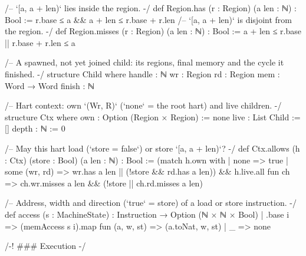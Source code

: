 \begin{leancode}[fontsize=\scriptsize,label={\footnotesize Contract/Machine.lean}]
/-- `[a, a + len)` lies inside the region. -/
def Region.has (r : Region) (a len : ℕ) : Bool := r.base ≤ a && a + len ≤ r.base + r.len
/-- `[a, a + len)` is disjoint from the region. -/
def Region.misses (r : Region) (a len : ℕ) : Bool := a + len ≤ r.base || r.base + r.len ≤ a

/-- A spawned, not yet joined child: its regions, final memory and the cycle it finished. -/
structure Child where
  handle : ℕ
  wr : Region
  rd : Region
  mem : Word → Word
  finish : ℕ

/-- Hart context: own `(Wr, R)` (`none` = the root hart) and live children. -/
structure Ctx where
  own : Option (Region × Region) := none
  live : List Child := []
  depth : ℕ := 0

/-- May this hart load (`store = false`) or store `[a, a + len)`? -/
def Ctx.allows (h : Ctx) (store : Bool) (a len : ℕ) : Bool :=
  (match h.own with | none => true | some (wr, rd) => wr.has a len || (!store && rd.has a len)) &&
    h.live.all fun ch => ch.wr.misses a len && (!store || ch.rd.misses a len)

/-- Address, width and direction (`true` = store) of a load or store instruction. -/
def access (s : MachineState) : Instruction → Option (ℕ × ℕ × Bool)
  | .base i => (memAccess s i).map fun (a, w, st) => (a.toNat, w, st)
  | _ => none

/-! ### Execution -/


\end{leancode}
